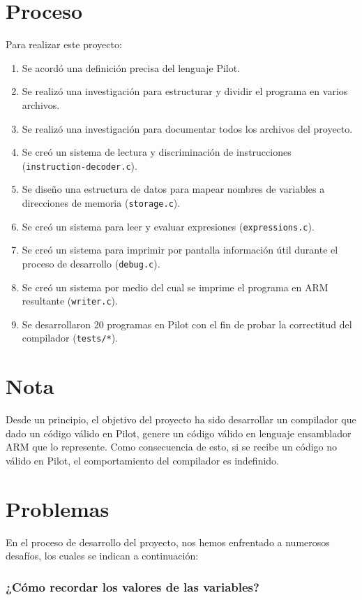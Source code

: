 \documentclass[12pt,spanish]{article}
\begin{document}
\section{Proceso}
Para realizar este proyecto:
\begin{enumerate}
\item{Se acordó una definición precisa del lenguaje Pilot.}
\item{Se realizó una investigación para estructurar y dividir el programa en varios archivos.}
\item{Se realizó una investigación para documentar todos los archivos del proyecto.}
\item{Se creó un sistema de lectura y discriminación de instrucciones (\texttt{instruction-decoder.c}).}
\item{Se diseño una estructura de datos para mapear nombres de variables a direcciones de memoria (\texttt{storage.c}).}
\item{Se creó un sistema para leer y evaluar expresiones (\texttt{expressions.c}).}
\item{Se creó un sistema para imprimir por pantalla información útil durante el proceso de desarrollo (\texttt{debug.c}).}
\item{Se creó un sistema por medio del cual se imprime el programa en ARM resultante (\texttt{writer.c}).}
\item{Se desarrollaron 20 programas en Pilot con el fin de probar la correctitud del compilador (\texttt{tests/*}).}
\end{enumerate}

\section{Nota}
Desde un principio, el objetivo del proyecto ha sido desarrollar un compilador que dado un código válido en Pilot, genere un código válido en lenguaje ensamblador ARM que lo represente. Como consecuencia de esto, si se recibe un código no válido en Pilot, el comportamiento del compilador es indefinido.

\section{Problemas}
En el proceso de desarrollo del proyecto, nos hemos enfrentado a numerosos desafíos, los cuales se indican a continuación:
\subsubsection{¿Cómo recordar los valores de las variables?}
\end{document}
